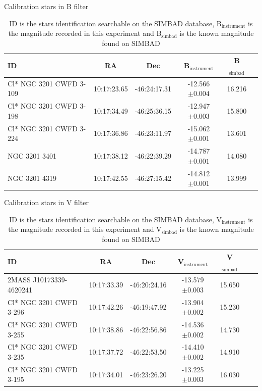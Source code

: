 \documentclass[11pt]{article}
\begin{document}
\begin{table}[H]
\centering
\caption{Calibration stars in B filter}
\begin{tabular}{lccccc}
\toprule
ID & RA & Dec & B$_{\text{instrument}}$ & B$_{\text{simbad}}$ \\
\midrule
Cl* NGC 3201 CWFD 3-109 &  10:17:23.65 &  -46:24:17.31 & -12.566$\pm 0.004$ & 16.216 \\                  
Cl* NGC 3201 CWFD 3-198 &  10:17:34.49 &  -46:25:36.15 & -12.947$\pm 0.003$ & 15.800 \\                 
Cl* NGC 3201 CWFD 3-224 &  10:17:36.86 &  -46:23:11.97 & -15.062$\pm 0.001$ & 13.601 \\                 
NGC 3201 3401 &  10:17:38.12 &  -46:22:39.29 & -14.787$\pm 0.001$ & 14.080 \\                           
NGC 3201 4319 &  10:17:42.55 &  -46:27:15.42 & -14.812$\pm 0.001$ & 13.999 \\
\bottomrule
\end{tabular}
\caption*{ID is the stars identification searchable on the SIMBAD database, B$_{\text{instrument}}$ is the magnitude recorded in this experiment and B$_{\text{simbad}}$ is the known magnitude found on SIMBAD \citep{simbad}}
\label{tab:calB}
\end{table}

\begin{table}[h]
\centering
\caption{Calibration stars in V filter}
\begin{tabular}{lcccccc}
\toprule
ID & RA & Dec & V$_{\text{instrument}}$ & V$_{\text{simbad}}$\\
\midrule
2MASS J10173339-4620241 & 10:17:33.39 & -46:20:24.16 & -13.579$\pm 0.003$ & 15.650 \\                   
Cl* NGC 3201 CWFD 3-296 & 10:17:42.26 & -46:19:47.92 & -13.904$\pm 0.002$ & 15.230 \\                  
Cl* NGC 3201 CWFD 3-255 & 10:17:38.86 & -46:22:56.86 & -14.536$\pm 0.002$ & 14.730 \\                  
Cl* NGC 3201 CWFD 3-235 & 10:17:37.72 & -46:22:53.50 & -14.410$\pm 0.002$ & 14.910 \\                     
Cl* NGC 3201 CWFD 3-195 & 10:17:34.01 & -46:23:26.20 & -13.225$\pm 0.003$ & 16.030\\ 
\bottomrule
\end{tabular}
\caption*{ID is the stars identification searchable on the SIMBAD database, V$_{\text{instrument}}$ is the magnitude recorded in this experiment and V$_{\text{simbad}}$ is the known magnitude found on SIMBAD \citep{simbad}}
\label{tab:calV}
\end{table}
\end{document}
